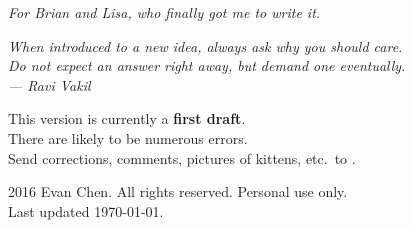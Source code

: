 \begin{titlepage}
	\vspace*{8cm}
	\begin{center}
		\itshape
		\noindent
		For Brian and Lisa, who finally got me to write it.
	\end{center}
\end{titlepage}

\begin{titlepage}
	\vspace*{8cm}
	\begin{flushright}
		\itshape\large
		When introduced to a new idea, always ask why you should care. \\[0.2cm]
		Do not expect an answer right away, but demand one eventually. \\[0.8cm]
		--- Ravi Vakil \cite{ref:vakil}
	\end{flushright}

	
	\vfill

	{
	\footnotesize
	\noindent This version is currently a \textbf{first draft}. \\
	There are likely to be numerous errors. \\
	Send corrections, comments, pictures of kittens,
	etc.\ to . \\[0.8cm]
	}
	
	\vspace*{1cm}

	{
	\large
	\noindent {\copyright} 2016 Evan Chen.  All rights reserved. Personal use only. \\[0.8cm]
	Last updated \today.
	\vspace*{1cm}
	}

\end{titlepage}
